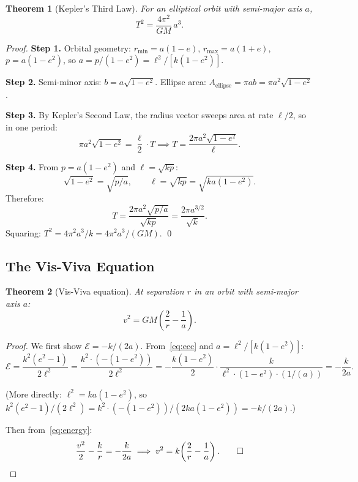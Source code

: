\documentclass[12pt,a4paper]{article}
\theoremstyle{plain}
\newtheorem{theorem}{Theorem}[section]
\theoremstyle{definition}
\theoremstyle{remark}
\begin{document}
\begin{theorem}[Kepler's Third Law]\label{thm:K3}
For an elliptical orbit with semi-major axis $a$,
\[
  T^2 = \frac{4\pi^2}{GM}\,a^3.
\]
\end{theorem}
\begin{proof}
\textbf{Step 1.} Orbital geometry: $r_{\min}=a(1-e)$, $r_{\max}=a(1+e)$, $p=a(1-e^2)$, so $a = p/(1-e^2) = \ell^2/[k(1-e^2)]$.

\textbf{Step 2.} Semi-minor axis: $b = a\sqrt{1-e^2}$. Ellipse area: $A_{\text{ellipse}} = \pi ab = \pi a^2\sqrt{1-e^2}$.

\textbf{Step 3.} By Kepler's Second Law, the radius vector sweeps area at rate $\ell/2$, so in one period:
\[
  \pi a^2\sqrt{1-e^2} = \frac{\ell}{2}\cdot T
  \implies
  T = \frac{2\pi a^2\sqrt{1-e^2}}{\ell}.
\]

\textbf{Step 4.} From $p=a(1-e^2)$ and $\ell=\sqrt{kp}$:
\[
  \sqrt{1-e^2} = \sqrt{p/a}, \qquad \ell = \sqrt{kp} = \sqrt{ka(1-e^2)}.
\]
Therefore:
\[
  T = \frac{2\pi a^2\sqrt{p/a}}{\sqrt{kp}} = \frac{2\pi a^{3/2}}{\sqrt{k}}.
\]
Squaring: $T^2 = 4\pi^2 a^3/k = 4\pi^2 a^3/(GM)$. \qed
\end{proof}

\subsection{The Vis-Viva Equation}

\begin{theorem}[Vis-Viva equation]\label{thm:visviva}
At separation $r$ in an orbit with semi-major axis $a$:
\[
  v^2 = GM\!\left(\frac{2}{r} - \frac{1}{a}\right).
\]
\end{theorem}
\begin{proof}
We first show $\mathcal{E} = -k/(2a)$. From~\eqref{eq:ecc} and $a=\ell^2/[k(1-e^2)]$:
\[
  \mathcal{E} = \frac{k^2(e^2-1)}{2\ell^2}
  = \frac{k^2\cdot(-(1-e^2))}{2\ell^2}
  = -\frac{k(1-e^2)}{2}\cdot\frac{k}{\ell^2\cdot(1-e^2)\cdot(1/(a))}
  = -\frac{k}{2a}.
\]

(More directly: $\ell^2 = ka(1-e^2)$, so $k^2(e^2-1)/(2\ell^2) = k^2\cdot(-(1-e^2))/(2ka(1-e^2)) = -k/(2a)$.)

Then from~\eqref{eq:energy}:
\[
  \frac{v^2}{2} - \frac{k}{r} = -\frac{k}{2a}
  \implies
  v^2 = k\!\left(\frac{2}{r}-\frac{1}{a}\right). \qed
\]
\end{proof}
\end{document}

